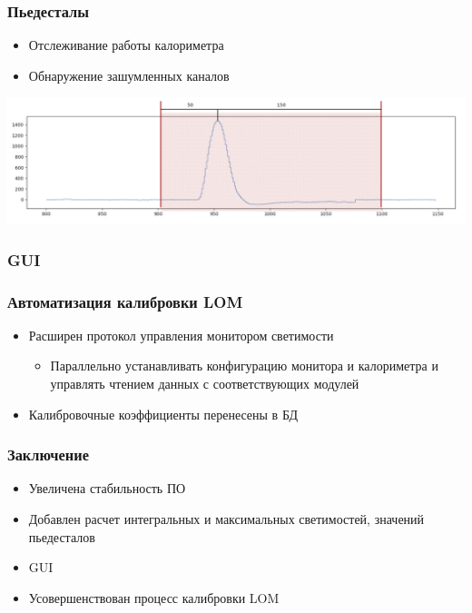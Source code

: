 \documentclass{beamer}
\begin{document}
\begin{frame}
\frametitle{Пьедесталы}
    \begin{itemize}
        \item Отслеживание работы калориметра
        \item Обнаружение зашумленных каналов
    \end{itemize}
    \includegraphics[width=\textwidth]{Pedestal.png}
\end{frame}

\begin{frame}
\frametitle{GUI}

\end{frame}

\begin{frame}
\frametitle{Автоматизация калибровки LOM}
    \begin{itemize}
        \item Расширен протокол управления монитором светимости
            \begin{itemize}
                \item Параллельно устанавливать конфигурацию монитора и калориметра и управлять чтением данных с соответствующих модулей
            \end{itemize}
        \item Калибровочные коэффициенты перенесены в БД
    \end{itemize}
\end{frame}

\begin{frame}
\frametitle{Заключение}
    \begin{itemize}
        \item Увеличена стабильность ПО
        \item Добавлен расчет интегральных и максимальных светимостей, значений пьедесталов
        \item GUI
        \item Усовершенствован процесс калибровки LOM
    \end{itemize}
\end{frame}
\end{document}

